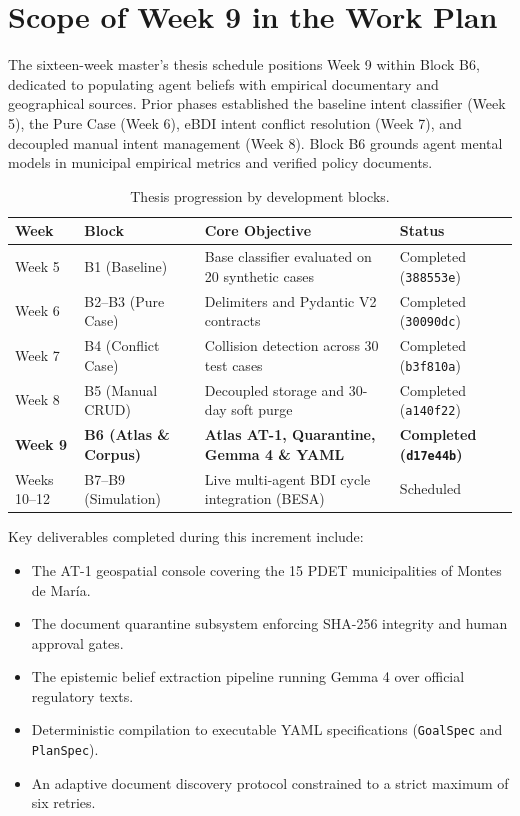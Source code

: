 \documentclass[11pt,a4paper]{article}
\begin{document}
\section{Scope of Week 9 in the Work Plan}

The sixteen-week master's thesis schedule positions Week 9 within Block B6, dedicated to populating agent beliefs with empirical documentary and geographical sources. Prior phases established the baseline intent classifier (Week 5), the Pure Case (Week 6), eBDI intent conflict resolution (Week 7), and decoupled manual intent management (Week 8). Block B6 grounds agent mental models in municipal empirical metrics and verified policy documents.

\begin{table}[H]
\centering
\small
\caption{Thesis progression by development blocks.}
\label{tab:schedule}
\begin{tabularx}{\textwidth}{lp{3.4cm}p{5.0cm}X}
\toprule
\textbf{Week} & \textbf{Block} & \textbf{Core Objective} & \textbf{Status} \\
\midrule
Week 5 & B1 (Baseline) & Base classifier evaluated on 20 synthetic cases & Completed (\texttt{388553e}) \\
Week 6 & B2--B3 (Pure Case) & Delimiters and Pydantic V2 contracts & Completed (\texttt{30090dc}) \\
Week 7 & B4 (Conflict Case) & Collision detection across 30 test cases & Completed (\texttt{b3f810a}) \\
Week 8 & B5 (Manual CRUD) & Decoupled storage and 30-day soft purge & Completed (\texttt{a140f22}) \\
\textbf{Week 9} & \textbf{B6 (Atlas \& Corpus)} & \textbf{Atlas AT-1, Quarantine, Gemma 4 \& YAML} & \textbf{Completed (\texttt{d17e44b})} \\
Weeks 10--12 & B7--B9 (Simulation) & Live multi-agent BDI cycle integration (BESA) & Scheduled \\
\bottomrule
\end{tabularx}
\end{table}

Key deliverables completed during this increment include:
\begin{itemize}[leftmargin=*]
    \item The AT-1 geospatial console covering the 15 PDET municipalities of Montes de María.
    \item The document quarantine subsystem enforcing SHA-256 integrity and human approval gates.
    \item The epistemic belief extraction pipeline running Gemma 4 over official regulatory texts.
    \item Deterministic compilation to executable YAML specifications (\texttt{GoalSpec} and \texttt{PlanSpec}).
    \item An adaptive document discovery protocol constrained to a strict maximum of six retries.
\end{itemize}
\end{document}
